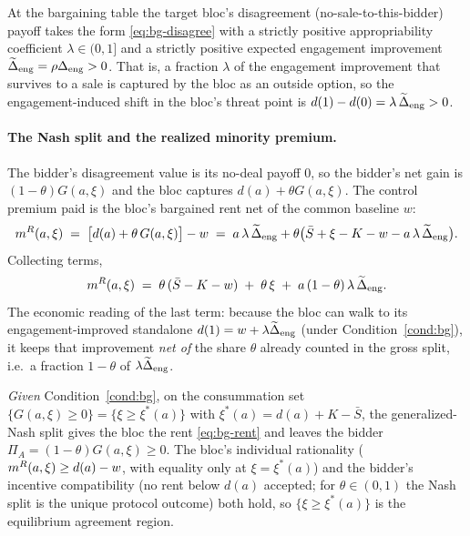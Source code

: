 \begin{condition}
\label{cond:bg}
At the bargaining table the target bloc's disagreement (no-sale-to-this-bidder)
payoff takes the form \eqref{eq:bg-disagree} with a strictly positive
appropriability coefficient $\lambda\in(0,1]$ and a strictly positive expected
engagement improvement $\widetilde{\Delta}_{\mathrm{eng}}=\rho\Delta_{\mathrm{eng}}>0$. That
is, a fraction $\lambda$ of the engagement improvement that survives to a sale is
captured by the bloc as an outside option, so the engagement-induced shift in the
bloc's threat point is $d(1)-d(0)=\lambda\,\widetilde{\Delta}_{\mathrm{eng}}>0$.
\end{condition}

\paragraph{The Nash split and the realized minority premium.}
The bidder's disagreement value is its no-deal payoff $0$, so the bidder's net
gain is $(1-\theta)G(a,\xi)$ and the bloc captures $d(a)+\theta G(a,\xi)$. The
control premium paid is the bloc's bargained rent net of the common baseline $w$:
\begin{equation}
  \label{eq:bg-rent}
  m^{R}(a,\xi)\;=\;\bigl[d(a)+\theta\,G(a,\xi)\bigr]-w
  \;=\;a\,\lambda\,\widetilde{\Delta}_{\mathrm{eng}}
       +\theta\bigl(\bar S+\xi-K-w-a\,\lambda\,\widetilde{\Delta}_{\mathrm{eng}}\bigr).
\end{equation}
Collecting terms,
\begin{equation}
  \label{eq:bg-rent2}
  m^{R}(a,\xi)\;=\;\theta\,(\bar S-K-w)\;+\;\theta\,\xi\;+\;a\,(1-\theta)\,\lambda\,\widetilde{\Delta}_{\mathrm{eng}} .
\end{equation}
The economic reading of the last term: because the bloc can walk to its
engagement-improved standalone $d(1)=w+\lambda\widetilde{\Delta}_{\mathrm{eng}}$ (under
Condition~\ref{cond:bg}), it keeps that improvement \emph{net of} the share
$\theta$ already counted in the gross split, i.e.\ a fraction $1-\theta$ of
$\lambda\widetilde{\Delta}_{\mathrm{eng}}$.

\begin{lemma}
\label{lem:bg-split}
\emph{Given} Condition~\ref{cond:bg}, on the consummation set
$\{G(a,\xi)\ge0\}=\{\xi\ge\xi^{\ast}(a)\}$ with $\xi^{\ast}(a)=d(a)+K-\bar S$, the
generalized-Nash split gives the bloc the rent \eqref{eq:bg-rent} and leaves the
bidder $\Pi_{A}=(1-\theta)G(a,\xi)\ge0$. The bloc's individual rationality
($m^{R}(a,\xi)\ge d(a)-w$, with equality only at $\xi=\xi^{\ast}(a)$) and the
bidder's incentive compatibility (no rent below $d(a)$ accepted; for
$\theta\in(0,1)$ the Nash split is the unique protocol outcome) both hold, so
$\{\xi\ge\xi^{\ast}(a)\}$ is the equilibrium agreement region.
\end{lemma}

